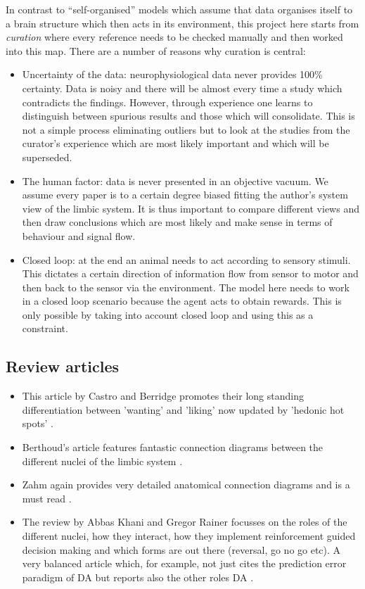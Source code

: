 \documentclass[12pt,a4paper]{article}
\begin{document}
In contrast to ``self-organised'' models which assume that data
organises itself to a brain structure which then acts in its
environment, this project here starts from \textsl{curation} where
every reference needs to be checked manually and then worked into this
map. There are a number of reasons why curation is central:
\begin{itemize}
\item Uncertainty of the data: neurophysiological data never
  provides 100\% certainty. Data is noisy and there will be
  almost every time a study which contradicts the findings. However,
  through experience one learns to distinguish between spurious
  results and those which will consolidate. This is not a simple
  process eliminating outliers but to look at the studies from
  the curator's experience which are most likely important
  and which will be superseded.
\item The human factor: data is never presented in an objective
  vacuum. We assume every paper is to a certain degree biased
  fitting the author's system view of the limbic system. It is
  thus important to compare different views and then draw
  conclusions which are most likely and make sense in terms
  of behaviour and signal flow.
\item Closed loop: at the end an animal needs to act according to
  sensory stimuli. This dictates a certain direction of information
  flow from sensor to motor and then back to the sensor via the
  environment. The model here needs to work in a closed loop
  scenario because the agent acts to obtain rewards. This is
  only possible by taking into account closed loop and using this
  as a constraint.
\end{itemize}


\subsection{Review articles}
\begin{itemize}
\item This article by Castro and Berridge promotes their long standing
  differentiation between 'wanting' and 'liking' \citep{Berridge2009}
  now updated by 'hedonic hot spots' \citep{Castro2015}.
\item Berthoud's article features fantastic connection diagrams
  between the different nuclei of the limbic system
  \citep{Berthoud04}.
\item Zahm again provides very detailed anatomical connection diagrams
  and is a must read \citep{Zahm00}.
\item The review by Abbas Khani and Gregor Rainer focusses on the
  roles of the different nuclei, how they interact, how they implement
  reinforcement guided decision making and which forms are out there
  (reversal, go no go etc). A very balanced article which, for
  example, not just cites the prediction error paradigm of DA but
  reports also the other roles DA \citep{Khani2016}.
\end{itemize}
\end{document}
